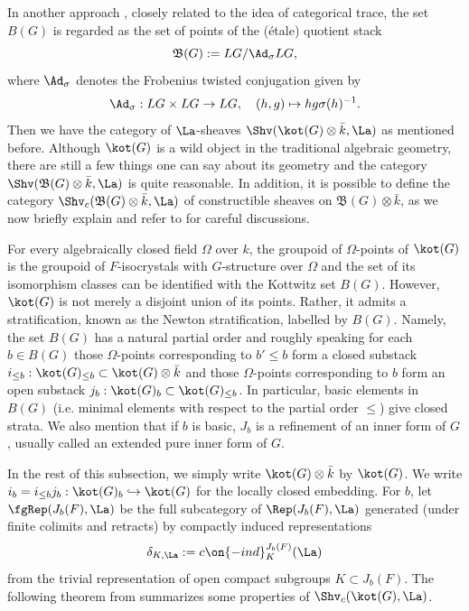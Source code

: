\documentclass[11pt]{amsart}
\theoremstyle{definition}
\theoremstyle{definition}
\theoremstyle{definition}
\numberwithin{equation}{section}
\newcommand{\frakB}{{\mathfrak B}}
\begin{document}
In another approach \cite{Xiao-Zhu-Cycle, Zhu-CDM, Zhu-Conjecture, Hemo-Zhu-Unipotent}, closely related to the idea of categorical trace, the set $B(G)$ is regarded as the set of points of the (\'etale) quotient stack 
\begin{equation*}\label{E: kot stack}
\frakB(G):=LG/\Ad_\sigma LG,
\end{equation*} 
where $\Ad_\sigma$ denotes the Frobenius twisted conjugation given by 
\[
\Ad_\sigma: LG\times LG\to LG,\quad  (h,g)\mapsto hg\sigma(h)^{-1}.
\]
Then we have the category of $\La$-sheaves $\Shv(\kot(G)\otimes \bar{k},\La)$ as mentioned before. Although $\kot(G)$ is a wild object in the traditional algebraic geometry, there are still a few things one can say about its geometry and
the category $\Shv(\frakB(G)\otimes \bar{k},\La)$ is quite reasonable. In addition, it is possible to define the category $\Shv_c(\frakB(G)\otimes \bar{k},\La)$ of constructible sheaves on $\frakB(G)\otimes \bar{k}$, as we now briefly explain and refer to \cite{Hemo-Zhu-Unipotent} for careful discussions.

For every algebraically closed field $\Omega$ over $k$, the groupoid of $\Omega$-points of $\kot(G)$ is the groupoid of $F$-isocrystals with $G$-structure over $\Omega$ and the set of its isomorphism classes can be identified with the Kottwitz set $B(G)$. However, $\kot(G)$ is not merely a disjoint union of its points. Rather, it admits a stratification, known as the Newton stratification, labelled by $B(G)$. Namely, the set $B(G)$ has a natural partial order and roughly speaking for each $b\in B(G)$ those $\Omega$-points corresponding to $b'\leq b$ form a closed substack $i_{\leq b}: \kot(G)_{\leq b}\subset \kot(G)\otimes \bar k$ and those $\Omega$-points corresponding to $b$ form an open substack $j_{b}: \kot(G)_b\subset \kot(G)_{\leq b}$.  
In particular, basic elements in $B(G)$ (i.e. minimal elements with respect to the partial order $\leq$) give closed strata. We also mention that if $b$ is basic, $J_b$ is a refinement of an inner form of $G$, usually called an extended pure inner form of $G$.

In the rest of this subsection, we simply write $\kot(G)\otimes \bar k$ by $\kot(G)$. We write $i_b=i_{\leq b}j_b: \kot(G)_b\hookrightarrow \kot(G)$ for the locally closed embedding. For $b$, let $\fgRep(J_b(F),\La)$ be the full subcategory of $\Rep(J_b(F),\La)$ generated (under finite colimits and retracts) by compactly induced representations 
\[
\delta_{K,\La}:=c\on{-ind}_K^{J_b(F)}(\La)
\]
from the trivial representation of open compact subgroups $K\subset J_b(F)$.   
The following theorem from \cite{Hemo-Zhu-Unipotent} summarizes some properties of $\Shv_c(\kot(G),\La)$. 
\end{document}
